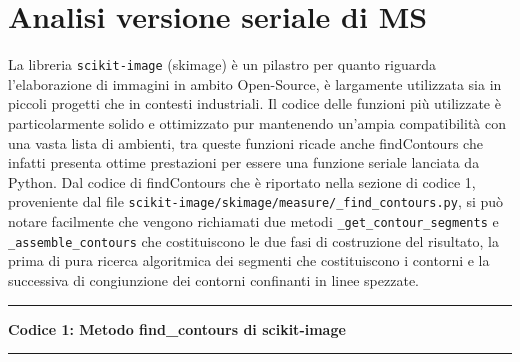 \documentclass[12pt,a4paper]{report}
\begin{document}
\section{Analisi versione seriale di MS}
La libreria \verb|scikit-image| (skimage) è un pilastro per quanto riguarda l'elaborazione di immagini in ambito Open-Source, è largamente utilizzata sia in piccoli progetti che in contesti industriali.  Il codice delle funzioni più utilizzate è particolarmente solido e ottimizzato pur mantenendo un'ampia compatibilità con una vasta lista di ambienti, tra queste funzioni ricade anche findContours che infatti presenta ottime prestazioni per essere una funzione seriale lanciata da Python.\newline
Dal codice di findContours che è riportato nella sezione di codice 1, proveniente dal file \verb|scikit-image/skimage/measure/_find_contours.py|, si può notare facilmente che vengono richiamati due metodi \verb|_get_contour_segments| e \verb|_assemble_contours| che costituiscono le due fasi di costruzione del risultato, la prima di pura ricerca algoritmica dei segmenti che costituiscono i contorni e la successiva di congiunzione dei contorni confinanti in linee spezzate. \\[10pt]
\noindent\rule[0.5ex]{\linewidth}{2pt}
\small{\textbf{Codice 1: Metodo find\_contours di scikit-image}} \\
\noindent\rule[0.5ex]{\linewidth}{1pt}
\end{document}
